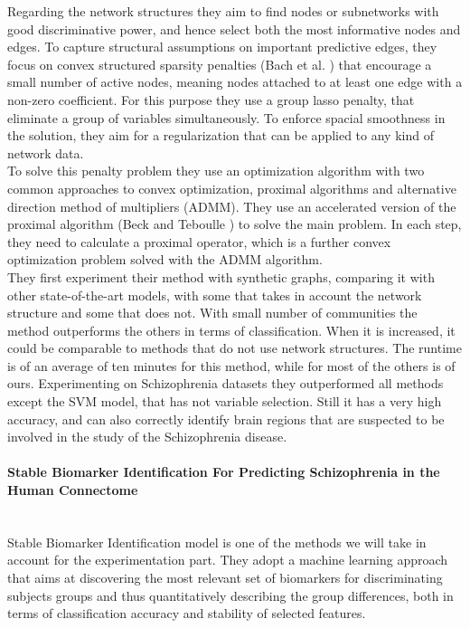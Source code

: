 Regarding the network structures they aim to find nodes or subnetworks with good discriminative power, and hence select both the most informative nodes and edges. To capture structural assumptions on important predictive edges, they focus on convex structured sparsity penalties (Bach et al. \cite{bach2012structured}) that encourage a small number of active nodes, meaning nodes attached to at least one edge with a non-zero coefficient. For this purpose they use a group lasso penalty, that eliminate a group of variables simultaneously. To enforce spacial smoothness in the solution, they aim for a regularization that can be applied to any kind of network data.
\\

To solve this penalty problem they use an optimization algorithm with two common approaches to convex optimization, proximal algorithms and alternative direction method of multipliers (ADMM). They use an accelerated version of the proximal algorithm (Beck and Teboulle \cite{beck2009fast}) to solve the main problem. In each step, they need to calculate a proximal operator, which is a further convex optimization problem solved with the ADMM algorithm.
\\

They first experiment their method with synthetic graphs, comparing it with other state-of-the-art models, with some that takes in account the network structure and some that does not. With small number of communities the method outperforms the others in terms of classification. When it is increased, it could be comparable to methods that do not use network structures. The runtime is of an average of ten minutes for this method, while for most of the others is of ours. 
Experimenting on Schizophrenia datasets they outperformed all methods except the SVM model, that has not variable selection. Still it has a very high accuracy, and can also correctly identify brain regions that are suspected to be involved in the study of the Schizophrenia disease. 

\paragraph{Stable Biomarker Identification For Predicting Schizophrenia in the Human Connectome}\
\label{par:4}
\\

Stable Biomarker Identification model \cite{GutierrezBio} is one of the methods we will take in account for the experimentation part. They adopt a machine learning approach that aims at discovering the most relevant set of biomarkers for discriminating subjects groups and thus quantitatively describing the group differences, both in terms of classification accuracy and stability of selected features. 
\\

